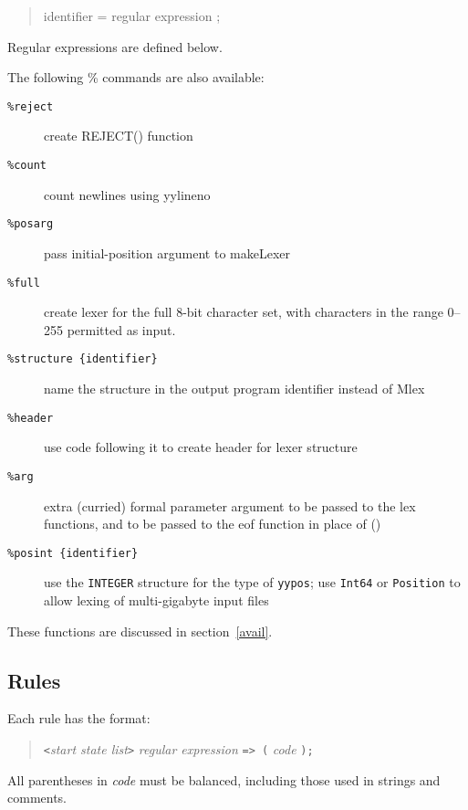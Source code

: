 \begin{quote}
        {identifier} = {regular expression} ;
\end{quote}

Regular expressions are defined below.

The following \% commands are also available:

\begin{description}
\item[\tt \%reject]     create REJECT() function
\item[\tt \%count]      count newlines using yylineno
\item[\tt \%posarg]     pass initial-position argument to makeLexer
\item[\tt \%full]       create lexer for the full 8-bit character set,
                          with characters in the range 0--255 permitted
                          as input.
\item[\tt \%structure \{identifier\}]  name the structure in the output program
                          {identifier} instead of Mlex
\item[\tt \%header]     use code following it to create header for lexer
                          structure
\item[\tt \%arg]       extra (curried) formal parameter argument to be
                          passed to the lex functions, and to be passed
                          to the eof function in place of ()
\item[\tt \%posint \{identifier\}]  use the {\tt INTEGER} structure for the 
                          type of {\tt yypos}; use {\tt Int64} or {\tt Position}
                          to allow lexing of multi-gigabyte input files
\end{description}
        These functions are discussed in section~\ref{avail}.

\subsection{Rules}

Each rule has the format:

\begin{quote}
       \verb|<|{\it start state list}\verb|>| {\it regular expression} \verb|=> (| {\it code} \verb|);|
\end{quote}

All parentheses in  {\it code}  must be balanced, including those
used in strings and comments.

